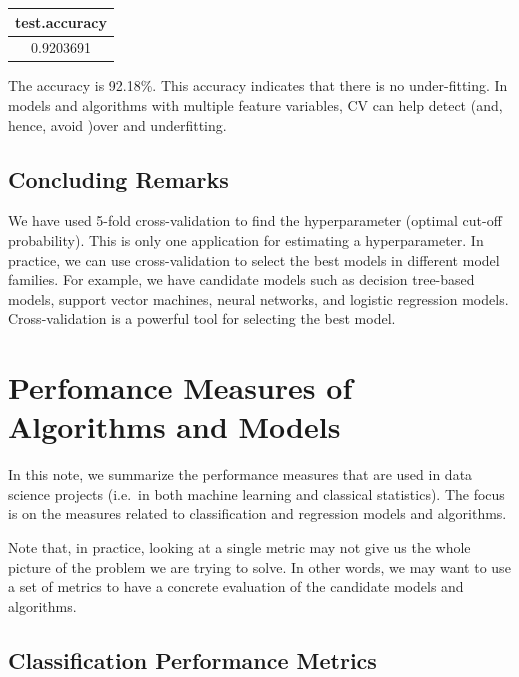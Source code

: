 \documentclass[
]{book}
\begin{document}
\begin{tabular}{c}
\hline
test.accuracy\\
\hline
0.9203691\\
\hline
\end{tabular}

The accuracy is 92.18\%. This accuracy indicates that there is no under-fitting. In models and algorithms with multiple feature variables, CV can help detect (and, hence, avoid )over and underfitting.

\hypertarget{concluding-remarks-1}{%
\section{Concluding Remarks}\label{concluding-remarks-1}}

We have used 5-fold cross-validation to find the hyperparameter (optimal cut-off probability). This is only one application for estimating a hyperparameter. In practice, we can use cross-validation to select the best models in different model families. For example, we have candidate models such as decision tree-based models, support vector machines, neural networks, and logistic regression models. Cross-validation is a powerful tool for selecting the best model.

\hfill\break

\hypertarget{perfomance-measures-of-algorithms-and-models}{%
\chapter{Perfomance Measures of Algorithms and Models}\label{perfomance-measures-of-algorithms-and-models}}

In this note, we summarize the performance measures that are used in data science projects (i.e.~in both machine learning and classical statistics). The focus is on the measures related to classification and regression models and algorithms.

Note that, in practice, looking at a single metric may not give us the whole picture of the problem we are trying to solve. In other words, we may want to use a set of metrics to have a concrete evaluation of the candidate models and algorithms.

\hypertarget{classification-performance-metrics}{%
\section{Classification Performance Metrics}\label{classification-performance-metrics}}
\end{document}
